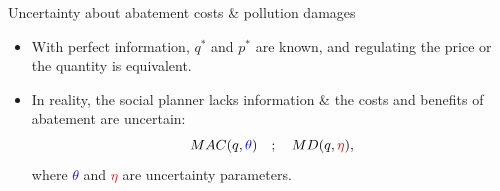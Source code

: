 \documentclass{beamer}
\begin{document}
\begin{frame}[label=w7_uncertainty]{Uncertainty about abatement costs \& pollution damages}

\begin{itemize}
  \item<1-> With perfect information, $q^*$ and $p^*$ are known, and regulating the price or the quantity is equivalent.

  \item<2-> In reality, the social planner lacks information \& the costs and benefits of abatement are uncertain:
  \[
  MAC(q,\textcolor{blue}{\theta}) \quad ; \quad MD(q,\textcolor{red}{\eta}),
  \]
  where \textcolor{blue}{$\theta$} and \textcolor{red}{$\eta$} are uncertainty parameters.
\end{itemize}

\vspace{0.2cm}


\end{frame}
\end{document}
